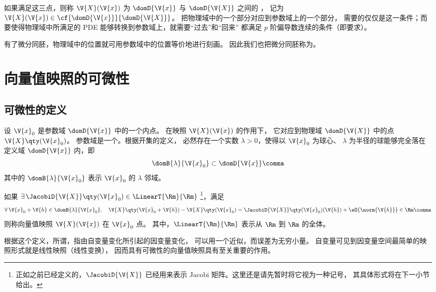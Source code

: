 
如果满足这三点，则称 $\V{X}(\V{x})$ 为 $\domD{\V{x}}$ 与
$\domD{\V{X}}$ 之间的 ，
记为 $\V{X}(\V{x})\in\cf{\domD{\V{x}}}{\domD{\V{X}}}$。
把物理域中的一个部分对应到参数域上的一个部分，
需要的仅仅是这一条件；而要使得物理域中所满足的
PDE 能够转换到参数域上，就需要“过去”和“回来”
都满足 $p$ 阶偏导数连续的条件（即要求）。

有了微分同胚，物理域中的位置就可用参数域中的位置等价地进行刻画。
因此我们也把微分同胚称为。

\section{向量值映照的可微性} \label{sec:向量值映照的可微性}
\subsection{可微性的定义}
设 $\V{x}_0$ 是参数域 $\domD{\V{x}}$ 中的一个内点。
在映照 $\V{X}(\V{x})$ 的作用下，
它对应到物理域 $\domD{\V{X}}$ 中的点 $\V{X}\qty(\V{x}_0)$。
参数域是一个。根据开集的定义，
必然存在一个实数 $\lambda>0$，使得以 $\V{x}_0$ 为球心、
$\lambda$ 为半径的球能够完全落在定义域 $\domD{\V{x}}$ 内，即
\begin{equation}
	\domB{\lambda}{\V{x}_0}\subset\domD{\V{x}} \comma
\end{equation}
其中的 $\domB{\lambda}{\V{x}_0}$ 表示 $\V{x}_0$ 的 $\lambda$ 邻域。

如果 $\exists\,\JacobiD{\V{X}}\qty(\V{x}_0)\in\LinearT{\Rm}{\Rm}$
\footnote{正如之前已经定义的，$\JacobiD{\V{X}}$
	已经用来表示 Jacobi 矩阵。这里还是请先暂时将它视为一种记号，
	其具体形式将在下一小节给出。}，满足
\begin{equation}
	\forall\,\V{x}_0+\V{h}\in\domB{\lambda}{\V{x}_0},\quad
	\V{X}\qty(\V{x}_0+\V{h})-\V{X}\qty(\V{x}_0)
	=\JacobiD{\V{X}}\qty(\V{x}_0)(\V{h})+\sO{\norm{\V{h}}}
	\in\Rm \comma
	\label{eq:向量值映照可微性的定义}
\end{equation}
则称向量值映照 $\V{X}(\V{x})$ 在 $\V{x}_0$ 点。
其中，$\LinearT{\Rm}{\Rm}$ 表示从 $\Rm$ 到 $\Rm$
的全体。

根据这个定义，所谓，指由自变量变化所引起的因变量变化，
可以用一个近似，而误差为无穷小量。
自变量可见到因变量空间最简单的映照形式就是线性映照（线性变换），
因而具有可微性的向量值映照具有至关重要的作用。


